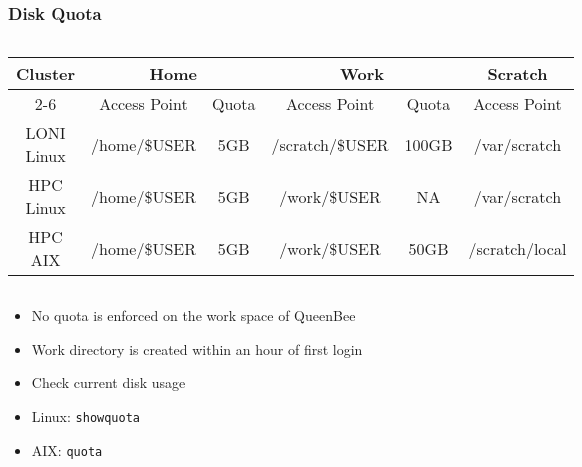 \documentclass[slidestop,mathserif,compress,xcolor=svgnames,table]{beamer}
\newcommand*\vardiamond{\textcolor{tigerspurple}{%
  \ensuremath{\blacklozenge}}}
\begin{document}
\begin{frame}
\frametitle{\small Disk Quota}
{\scriptsize
\begin{columns}
\column{12cm}
\begin{block}{}
\begin{center}
\begin{tabular}{|c|c|c|c|c|c|}
\hline
\multirow{2}{*}{Cluster} & \multicolumn{2}{c|}{Home} & \multicolumn{2}{c|}{Work} & Scratch \\
\cline{2-6}
 & Access Point & Quota & Access Point & Quota & Access Point \\
\hline
LONI Linux & /home/\$USER & 5GB & /scratch/\$USER & 100GB & /var/scratch\\
\hline
HPC Linux & /home/\$USER & 5GB & /work/\$USER & NA & /var/scratch\\
\hline
HPC AIX & /home/\$USER & 5GB & /work/\$USER & 50GB & /scratch/local\\
\hline
\end{tabular}
\end{center}
\end{block}
\end{columns}
}
{\footnotesize
\begin{itemize}
\item No quota is enforced on the work space of QueenBee
\item Work directory is created within an hour of first login
\item Check current disk usage
\item[$\vardiamond$] Linux: \texttt{showquota}
\item[$\vardiamond$] AIX: \texttt{quota}
\end{itemize}
}
\end{frame}
\end{document}
